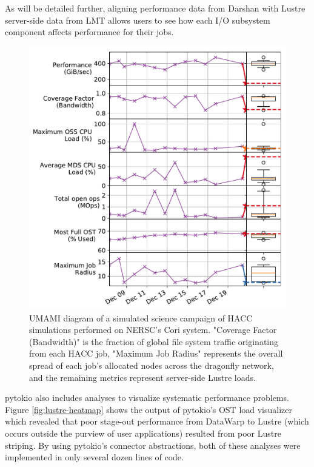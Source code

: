As will be detailed further, aligning performance data from Darshan with Lustre server-side data from LMT allows users to see how each I/O subsystem component affects performance for their jobs.

\begin{figure}[t]
    \centering
    \includegraphics[width=1.0\columnwidth]{umami}
    \vspace{-.3in}
    \caption{UMAMI diagram of a simulated science campaign of HACC~\cite{Habib2012} simulations performed on NERSC's Cori system.  "Coverage Factor (Bandwidth)" is the fraction of global file system traffic originating from each HACC job, "Maximum Job Radius" represents the overall spread of each job's allocated nodes across the dragonfly network, and the remaining metrics represent server-side Lustre loads.}
    \label{fig:umami}
    \vspace{-.2in}
\end{figure}

pytokio also includes analyses to visualize systematic performance problems.  Figure \ref{fig:lustre-heatmap} shows the output of pytokio's OST load visualizer which revealed that poor stage-out performance from DataWarp to Lustre (which occurs outside the purview of user applications) resulted from poor Lustre striping.  By using pytokio's connector abstractions, both of these analyses were implemented in only several dozen lines of code.

